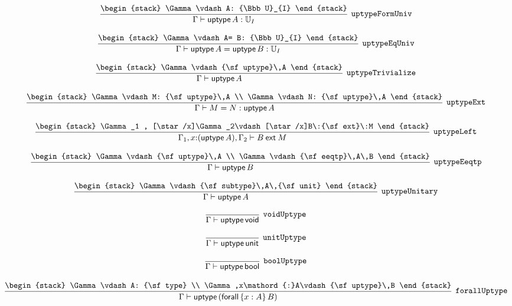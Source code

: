 \[
\infer[{\tt uptypeFormUniv}]{\Gamma \vdash {\sf uptype}\,A: {\Bbb U}_{I}}{
\begin{stack}
\Gamma \vdash A: {\Bbb U}_{I}
\end{stack}}
\]

\[
\infer[{\tt uptypeEqUniv}]{\Gamma \vdash {\sf uptype}\,A= {\sf uptype}\,B: {\Bbb U}_{I}}{
\begin{stack}
\Gamma \vdash A= B: {\Bbb U}_{I}
\end{stack}}
\]

\[
\infer[{\tt uptypeTrivialize}]{\Gamma \vdash {\sf uptype}\,A}{
\begin{stack}
\Gamma \vdash {\sf uptype}\,A
\end{stack}}
\]

\[
\infer[{\tt uptypeExt}]{\Gamma \vdash M= N: {\sf uptype}\,A}{
\begin{stack}
\Gamma \vdash M: {\sf uptype}\,A
\\
\Gamma \vdash N: {\sf uptype}\,A
\end{stack}}
\]

\[
\infer[{\tt uptypeLeft}]{\Gamma_1 ,x\mathord{:}({\sf uptype}\,A), \Gamma_2 \vdash B\:{\sf ext}\:M}{
\begin{stack}
\Gamma_1 , [\star /x]\Gamma_2\vdash [\star /x]B\:{\sf ext}\:M
\end{stack}}
\]

\[
\infer[{\tt uptypeEeqtp}]{\Gamma \vdash {\sf uptype}\,B}{
\begin{stack}
\Gamma \vdash {\sf uptype}\,A
\\
\Gamma \vdash {\sf eeqtp}\,A\,B
\end{stack}}
\]

\[
\infer[{\tt uptypeUnitary}]{\Gamma \vdash {\sf uptype}\,A}{
\begin{stack}
\Gamma \vdash {\sf subtype}\,A\,{\sf unit}
\end{stack}}
\]

\[
\infer[{\tt voidUptype}]{\Gamma \vdash {\sf uptype}\,{\sf void}}{}
\]

\[
\infer[{\tt unitUptype}]{\Gamma \vdash {\sf uptype}\,{\sf unit}}{}
\]

\[
\infer[{\tt boolUptype}]{\Gamma \vdash {\sf uptype}\,{\sf bool}}{}
\]

\[
\infer[{\tt forallUptype}]{\Gamma \vdash {\sf uptype}\,({\sf forall}\,\{x : A\}\,B)}{
\begin{stack}
\Gamma \vdash A: {\sf type}
\\
\Gamma ,x\mathord{:}A\vdash {\sf uptype}\,B
\end{stack}}
\]

